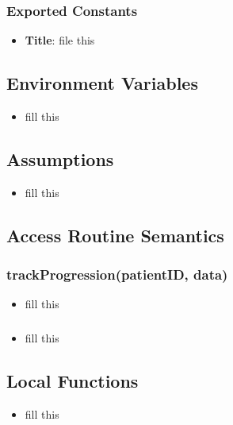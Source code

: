 \documentclass[12pt, titlepage]{article}
\begin{document}
\subsubsection{Exported Constants}
\begin{itemize}
\item \textbf{Title}: file this 
\end{itemize}

\subsection{Environment Variables}
\begin{itemize}
    \item fill this
\end{itemize}

\subsection{Assumptions}
\begin{itemize}
    \item fill this
\end{itemize}

\subsection{Access Routine Semantics}
\subsubsection{trackProgression(patientID, data)}

\begin{itemize}
    \item fill this
\end{itemize}

\subsubsection{}

\begin{itemize}
    \item fill this
\end{itemize}

\subsection{Local Functions}
\begin{itemize}
    \item fill this
\end{itemize}
\end{document}
